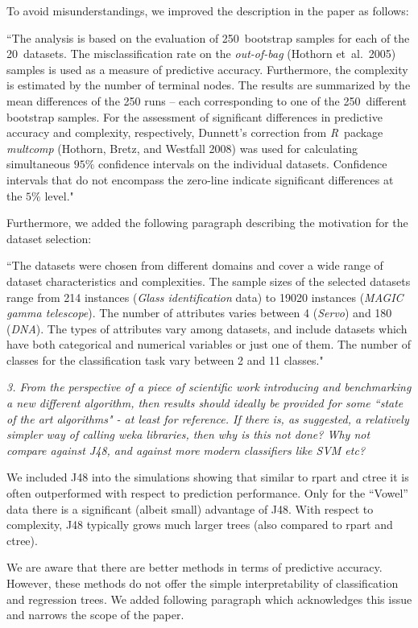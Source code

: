 \documentclass[DIN, pagenumber=false, parskip=half,%
               fromalign=left, fromphone=true,%
               fromemail=true, fromurl=false, %
               fromlogo=true, fromrule=false, fromrule=afteraddress]{scrlttr2}
\begin{document}
To avoid misunderstandings, we improved the description in the paper as follows:

``The analysis is based on the evaluation of 250~bootstrap
samples for each of the 20~datasets. The misclassification rate on the
\textit{out-of-bag} (Hothorn et~al.~2005) samples is used as a measure of
predictive accuracy. Furthermore, the complexity is estimated by the number of
terminal nodes. The results are summarized by the mean differences of the 250 runs -- each corresponding to
one of the 250~different bootstrap samples. For the assessment of significant differences 
in predictive accuracy and complexity, respectively, 
Dunnett's correction from \textit{R}~package \textit{multcomp} (Hothorn, Bretz, and Westfall 2008) was used
for calculating simultaneous $95\%$ confidence intervals on the individual datasets. Confidence intervals
that do not encompass the zero-line indicate significant differences at the $5\%$ level."

Furthermore, we added the following paragraph describing the motivation for the dataset selection:

``The datasets were chosen from different domains and cover a wide range of
dataset characteristics and complexities. The sample sizes of the selected
datasets range from 214 instances (\textit{Glass identification} data) to 19020
instances (\emph{MAGIC gamma telescope}). The number of attributes varies between
4 (\textit{Servo}) and 180 (\emph{DNA}). The types of attributes vary among
datasets, and include datasets which have both categorical and numerical
variables or just one of them. The number of classes for the classification task
vary between 2 and 11 classes."


\textit{3. From the perspective of  a piece of scientific work introducing 
and benchmarking a new  different algorithm, then results should 
ideally be provided for some ``state of the art algorithms" - at 
least for reference.  If there is, as suggested, a relatively 
simpler way of calling weka libraries,  then why is this not 
done?  Why not compare against J48,  and against more modern 
classifiers like SVM etc?}

We included J48 into the simulations showing that similar to rpart and ctree it
is often outperformed with respect to prediction performance. Only for the ``Vowel''
data there is a significant (albeit small) advantage of J48. With respect to complexity,
J48 typically grows much larger trees (also compared to rpart and ctree).

We are aware that there are better methods in terms of predictive accuracy. However, these methods do not offer the simple
interpretability of classification and regression trees. We added following
paragraph which acknowledges this issue and narrows the scope of the paper.
\end{document}
